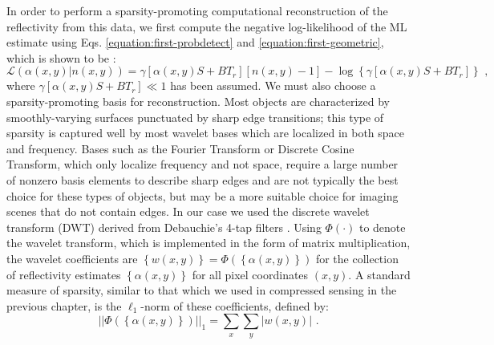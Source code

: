 In order to perform a sparsity-promoting computational reconstruction of the reflectivity from this data, we first compute the negative log-likelihood of the ML estimate using Eqs. \ref{equation:first-probdetect} and \ref{equation:first-geometric}, which is shown to be \cite{kirmani-first}:
\begin{equation}
\mathcal{L}\left( \alpha(x,y) | n(x,y) \right) = \gamma \left[ \alpha(x,y) S + B T_r \right] \left[ n(x,y) - 1 \right] - \log \left\{ \gamma \left[ \alpha(x,y) S + B T_r \right] \right\}\,\,,
\end{equation}
where $\gamma\left[\alpha(x,y)S + BT_r\right] \ll 1$ has been assumed.
We must also choose a sparsity-promoting basis for reconstruction. Most objects are characterized by smoothly-varying surfaces punctuated by sharp edge transitions; this type of sparsity is captured well by most wavelet bases which are localized in both space and frequency. Bases such as the Fourier Transform or Discrete Cosine Transform, which only localize frequency and not space, require a large number of nonzero basis elements to describe sharp edges and are not typically the best choice for these types of objects, but may be a more suitable choice for imaging scenes that do not contain edges. In our case we used the discrete wavelet transform (DWT) derived from Debauchie's 4-tap filters \cite{mallat-wavelet}. Using $\Phi\left(\cdot\right)$ to denote the wavelet transform, which is implemented in the form of matrix multiplication, the wavelet coefficients are $\left\{ w(x,y) \right\} = \Phi(\left\{ \alpha(x,y) \right\})$ for the collection of reflectivity estimates $\left\{ \alpha(x,y) \right\}$ for all pixel coordinates $(x,y)$. A standard measure of sparsity, similar to that which we used in compressed sensing in the previous chapter, is the $\ell_1$-norm of these coefficients, defined by:
\begin{equation}
|| \Phi\left(\left\{ \alpha(x,y) \right\}\right) ||_1 = \sum_x \sum_y | w(x,y) |\,\,.
\end{equation}

